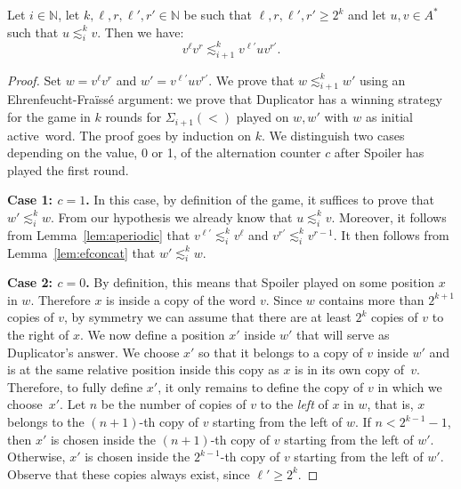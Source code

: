 \documentclass[envcountsame]{llncs}
\newcommand{\efgame}{Ehrenfeucht-Fra\"iss\'e\xspace}
\newcommand\nat{\ensuremath{\mathbb{N}}\xspace}
\newcommand{\siw}[1]{\ensuremath{\Sigma_{#1}(<)}\xspace}
\newcommand\sieq[2]{\ensuremath{\lesssim^{#1}_{#2}}\xspace}
\newcommand\ksieq[1]{\sieq{k}{#1}}
\newcommand\gmo{\ensuremath{\geqslant}\xspace}
\begin{document}
\begin{lemma} \label{lem:siprop}
  Let $i \in \nat$, let $k,\ell,r,\ell',r' \in \nat$ be such
  that $\ell,r,\ell',r' \gmo 2^k$ and let $u,v \in
  A^*$ such that $u \ksieq{i} v$. Then we have:
  \[
  v^{\ell}v^{r} \ksieq{i+1} v^{\ell'}uv^{r'}.
  \]
\end{lemma}

\begin{proof}
  Set $w = v^\ell v^{r}$ and $w' = v^{\ell'}uv^{r'}$. We prove
  that $w \ksieq{i+1} w'$ using an \efgame argument: we prove that Duplicator
  has a winning strategy for the game in $k$ rounds for \siw{i+1} played on $w,w'$ with $w$
  as initial active~word. The proof goes by induction on $k$. We
  distinguish two cases depending on the value, 0 or 1, of the alternation counter $c$
  after Spoiler has played the first round.

  \medskip
  \noindent
  {\bf Case 1: $c=1$.} In this case, by definition of the game, it
  suffices to prove that $w' \ksieq{i} w$. From our hypothesis we
  already know that $u \ksieq{i} v$. Moreover, it follows from
  Lemma~\ref{lem:aperiodic} that $v^{\ell'} \ksieq{i} v^\ell$
  and $v^{r'} \ksieq{i} v^{r - 1}$. It then follows from
  Lemma~\ref{lem:efconcat} that $w' \ksieq{i} w$.

  \medskip
  \noindent
  {\bf Case 2: $c=0$.} By definition, this means that Spoiler played on some
  position $x$ in $w$. Therefore $x$ is inside a copy of the word $v$. Since
  $w$ contains more than $2^{k+1}$ copies of $v$, by symmetry we can assume
  that there are at least $2^{k}$ copies of $v$ to the right of $x$. We now
  define a position $x'$ inside $w'$ that will serve as Duplicator's
  answer. We choose $x'$ so that it belongs to a copy of $v$ inside $w'$ and
  is at the same relative position inside this copy as $x$ is in its own copy
  of~$v$. Therefore, to fully define $x'$, it only remains to define the copy
  of $v$ in which we choose~$x'$. Let $n$ be the number of copies of $v$ to
  the \emph{left} of $x$ in $w$, that is, $x$ belongs to the
  $(n+1)$-th copy of $v$   starting from the left of $w$. If $n <
  2^{k-1}-1$, then $x'$ is chosen inside the $(n+1)$-th copy of $v$
  starting from the left of $w'$. Otherwise, $x'$ is chosen inside the
  $2^{k-1}$-th copy of $v$ starting from the left of $w'$. Observe
  that these copies always exist, since $\ell'\gmo 2^k$.


\end{proof}
\end{document}
